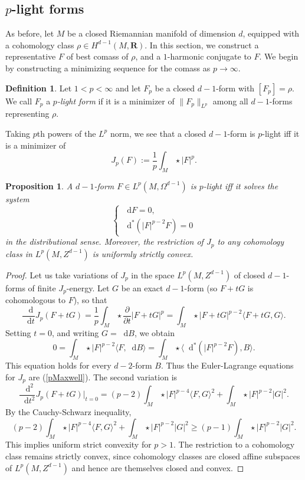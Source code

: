 \documentclass[reqno,11pt]{amsart}
\newcommand{\RR}{\mathbf{R}}
\newcommand*\dif{\mathop{}\!\mathrm{d}}
\newcommand{\dfn}[1]{\emph{#1}\index{#1}}
\newtheorem{proposition}[theorem]{Proposition}
\theoremstyle{definition}
\newtheorem{definition}[theorem]{Definition}
\numberwithin{equation}{section}
\begin{document}
\subsection{\texorpdfstring{$p$-light forms}{p-light forms}}
As before, let $M$ be a closed Riemannian manifold of dimension $d$, equipped with a cohomology class $\rho \in H^{d - 1}(M, \RR)$.
In this section, we construct a representative $F$ of best comass of $\rho$, and a $1$-harmonic conjugate to $F$.
We begin by constructing a minimizing sequence for the comass as $p \to \infty$.

\begin{definition}
Let $1 < p < \infty$ and let $F_p$ be a closed $d - 1$-form with $[F_p] = \rho$.
We call $F_p$ a \dfn{$p$-light form} if it is a minimizer of $\|F_p\|_{L^p}$ among all $d - 1$-forms representing $\rho$.
\end{definition}

Taking $p$th powers of the $L^p$ norm, we see that a closed $d - 1$-form is $p$-light iff it is a minimizer of
$$J_p(F) := \frac{1}{p} \int_M \star |F|^p.$$

\begin{proposition}
A $d - 1$-form $F \in L^p(M, \Omega^{d - 1})$ is $p$-light iff it solves the system
\begin{equation}\label{pMaxwell}
\begin{cases}
	\dif F = 0, \\
	\dif^*(|F|^{p - 2} F) = 0
\end{cases}
\end{equation}
in the distributional sense. Moreover, the restriction of $J_p$ to any cohomology class in $L^p(M, Z^{d - 1})$ is uniformly strictly convex.
\end{proposition}
\begin{proof}
Let us take variations of $J_p$ in the space $L^p(M, Z^{d - 1})$ of closed $d-1$-forms of finite $J_p$-energy.
Let $G$ be an exact $d - 1$-form (so $F + tG$ is cohomologous to $F$), so that
$$\frac{\dif}{\dif t} J_p(F + tG) = \frac{1}{p} \int_M \star \frac{\partial}{\partial t} |F + tG|^p = \int_M \star |F + tG|^{p - 2} \langle F + tG, G\rangle.$$
Setting $t = 0$, and writing $G = \dif B$, we obtain 
$$0 = \int_M \star |F|^{p - 2} \langle F, \dif B\rangle = \int_M \star \langle \dif^*(|F|^{p - 2} F), B\rangle.$$
This equation holds for every $d - 2$-form $B$.
Thus the Euler-Lagrange equations for $J_p$ are (\ref{pMaxwell}).
The second variation is 
$$\frac{\dif^2}{\dif t^2} J_p(F + tG)\bigg|_{t = 0} = (p - 2) \int_M \star |F|^{p - 4} \langle F, G\rangle^2 + \int_M \star |F|^{p - 2} |G|^2.$$
By the Cauchy-Schwarz inequality,
$$(p - 2) \int_M \star |F|^{p - 4} \langle F, G\rangle^2 + \int_M \star |F|^{p - 2} |G|^2 \geq (p - 1) \int_M \star |F|^{p - 2} |G|^2.$$
This implies uniform strict convexity for $p > 1$.
The restriction to a cohomology class remains strictly convex, since cohomology classes are closed affine subspaces of $L^p(M, Z^{d - 1})$ and hence are themselves closed and convex.
\end{proof}
\end{document}
